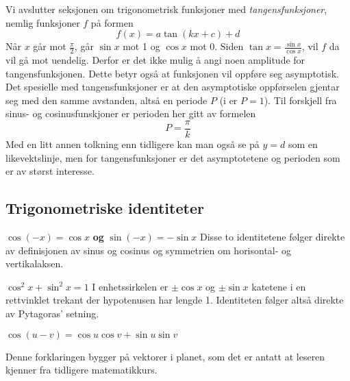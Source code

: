 Vi avslutter seksjonen om trigonometrisk funksjoner med \textit{tangensfunksjoner}, nemlig funksjoner $ f $ på formen
\[ f(x)= a\tan(kx+c)+d \]
Når $ x $ går mot $ \frac{\pi}{2}$, går $ \sin x $ mot 1 og $ \cos x $ mot 0. Siden $ {\tan x = \frac{\sin x}{\cos x}} $, vil $ f $ da vil gå mot uendelig. Derfor er det ikke mulig å angi noen amplitude for tangensfunksjonen. Dette betyr også at funksjonen vil oppføre seg asymptotisk.\vs
{}
Det spesielle med tangensfunksjoner er at den asymptotiske oppførselen gjentar seg med den samme avstanden, altså en periode $ P $ (i  er $ {P=1} $). Til forskjell fra  sinus- og cosinusfunskjoner er perioden her gitt av formelen
\[ P=\frac{\pi}{k} \]
Med en litt annen tolkning enn tidligere kan man også se på ${ y=d} $ som en likevektslinje, men for tangensfunksjoner er det asymptotetene og perioden som er av størst interesse. \regv
\tanf

\newpage
{}
\subsection*{Trigonometriske identiteter}
{\boldmath $ \cos(-x)=\cos x$ \textbf{og} $ \sin(-x)=-\sin x $} \bs
Disse to identitetene følger direkte av definisjonen av sinus og cosinus og symmetrien om horisontal- og vertikalaksen.\vsk

{\boldmath $ \cos^2 x + \sin^2 x = 1 $}\bs
I enhetssirkelen er $ \pm \cos x $ og $\pm  \sin x $ katetene i en rettvinklet trekant der hypotenusen har lengde 1. Identiteten følger altså direkte av Pytagoras’ setning. \vsk

{\boldmath$  \cos(u-v)= \cos u\cos v + \sin u\sin v $} \bs

Denne forklaringen bygger på vektorer i planet, som det er antatt at leseren kjenner fra tidligere matematikkurs.\vsk

